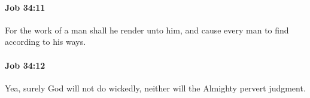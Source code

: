 		\paragraph{Job 34:11} %
			\label{JOB-34-11}

			For the work of a man shall he render unto him, and cause every man to find according to his ways.


		\paragraph{Job 34:12} %
			\label{JOB-34-12}

			Yea, surely God will not do wickedly, neither will the Almighty pervert judgment.


